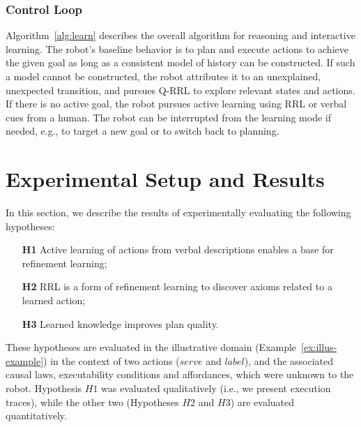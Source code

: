 \documentclass{article}
\begin{document}
\subsubsection{Control Loop}
Algorithm~\ref{alg:learn} describes the overall algorithm for
reasoning and interactive learning. The robot's baseline behavior is
to plan and execute actions to achieve the given goal as long as a
consistent model of history can be constructed. If such a model cannot
be constructed, the robot attributes it to an unexplained, unexpected
transition, and pursues Q-RRL to explore relevant states and actions.
If there is no active goal, the robot pursues active learning using
RRL or verbal cues from a human. The robot can be interrupted from the
learning mode if needed, e.g., to target a new goal or to switch back
to planning.



\section{Experimental Setup and Results}
\label{sec:exp}
In this section, we describe the results of experimentally evaluating
the following hypotheses:
\begin{itemize}
\item[\textbf{H1}] Active learning of actions from verbal descriptions
  enables a base for refinement learning;
\item[\textbf{H2}] RRL is a form of refinement learning to discover
  axioms related to a learned action;
\item[\textbf{H3}] Learned knowledge improves plan quality.
\end{itemize}
These hypotheses are evaluated in the illustrative domain
(Example~\ref{ex:illus-example}) in the context of two actions
($serve$ and $label$), and the associated causal laws, executability
conditions and affordances, which were unknown to the robot.
Hypothesis $H1$ was evaluated qualitatively (i.e., we present
execution traces), while the other two (Hypotheses $H2$ and $H3$) are
evaluated quantitatively.

\end{document}
